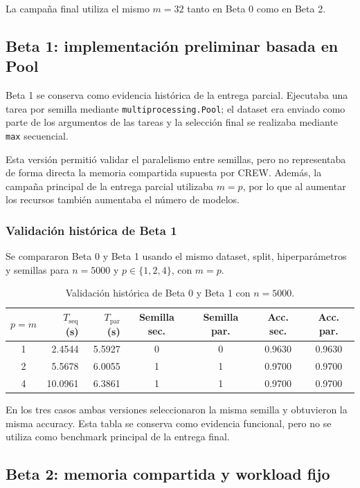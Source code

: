 \documentclass[11pt,a4paper]{article}
\begin{document}
La campaña final utiliza el mismo $m=32$ tanto en Beta 0 como en Beta 2.

\subsection{Beta 1: implementación preliminar basada en Pool}

Beta 1 se conserva como evidencia histórica de la entrega parcial. Ejecutaba una tarea
por semilla mediante \texttt{multiprocessing.Pool}; el dataset era enviado como parte
de los argumentos de las tareas y la selección final se realizaba mediante
\texttt{max} secuencial.

Esta versión permitió validar el paralelismo entre semillas, pero no representaba de
forma directa la memoria compartida supuesta por CREW. Además, la campaña principal de
la entrega parcial utilizaba $m=p$, por lo que al aumentar los recursos también aumentaba
el número de modelos.

\subsubsection{Validación histórica de Beta 1}

Se compararon Beta 0 y Beta 1 usando el mismo dataset, split, hiperparámetros y semillas
para $n=5000$ y $p\in\{1,2,4\}$, con $m=p$.

\begin{table}[H]
\centering
\begin{tabular}{c r r c c c c}
\toprule
$p=m$ & $T_{\mathrm{seq}}$ (s) & $T_{\mathrm{par}}$ (s) &
Semilla sec. & Semilla par. & Acc. sec. & Acc. par. \\
\midrule
1 & 2.4544 & 5.5927 & 0 & 0 & 0.9630 & 0.9630 \\
2 & 5.5678 & 6.0055 & 1 & 1 & 0.9700 & 0.9700 \\
4 & 10.0961 & 6.3861 & 1 & 1 & 0.9700 & 0.9700 \\
\bottomrule
\end{tabular}
\caption{Validación histórica de Beta 0 y Beta 1 con $n=5000$.}
\label{tab:validacion-beta1}
\end{table}

En los tres casos ambas versiones seleccionaron la misma semilla y obtuvieron la misma
accuracy. Esta tabla se conserva como evidencia funcional, pero no se utiliza como
benchmark principal de la entrega final.

\subsection{Beta 2: memoria compartida y workload fijo}
\end{document}
